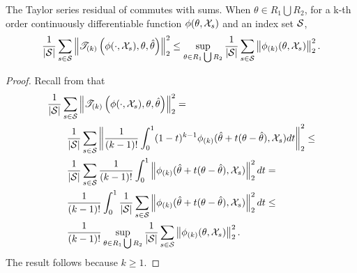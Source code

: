 

\begin{lem}
%
The Taylor series residual of  commutes with sums.
%
When $\theta \in R_1 \bigcup R_2$, for a k-th order continuously differentiable
function $\phi(\theta, {\mathcal{X}}_s)$ and an index set $\mathcal{S}$,
%
\begin{align*}
%
\means \norm{\tresid{k}{\phi(\cdot, \xvec_s), \theta, \thetahat}}_2^2 \le
\sup_{\theta \in R_1 \bigcup R_2}
    \means \norm{\phi_{(k)}(\theta, \xvec_s)}_2^2.
%
\end{align*}
%
\begin{proof}
%
Recall from  that
%
\begin{align*}
%
\MoveEqLeft
\means \norm{\tresid{k}{\phi(\cdot, \xvec_s), \theta, \thetahat}}_2^2
=\\{}&
\means \norm{
    \frac{1}{(k-1)!} \int_0^1 (1 - t)^{k-1}
    \phi_{(k)}(\thetahat + t (\theta - \thetahat), \xvec_s) dt
}_2^2
\le\\&
\means \frac{1}{(k-1)!} \int_0^1
\norm{\phi_{(k)}(\thetahat + t (\theta - \thetahat), \xvec_s)}_2^2 dt
=\\&
\frac{1}{(k-1)!} \int_0^1
\means \norm{\phi_{(k)}(\thetahat + t (\theta - \thetahat), \xvec_s)}_2^2 dt
\le\\&
\frac{1}{(k-1)!}
\sup_{\theta \in R_1 \bigcup R_2}
    \means\norm{\phi_{(k)}(\theta, \xvec_s)}_2^2.
%
\end{align*}
%
The result follows because $k \ge 1$.
%
\end{proof}
%
\end{lem}




